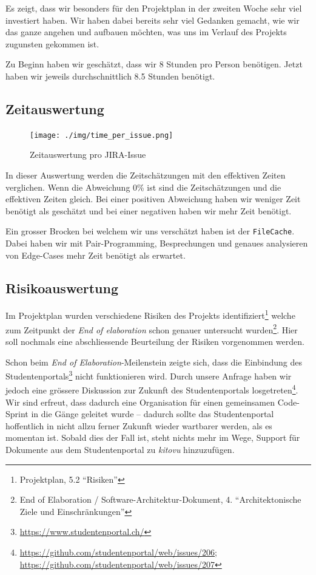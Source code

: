\documentclass[a4paper]{article}
\begin{document}
Es zeigt, dass wir besonders für den Projektplan in der zweiten Woche sehr viel investiert haben.
Wir haben dabei bereits sehr viel Gedanken gemacht, wie wir das ganze angehen und aufbauen möchten, was uns im Verlauf des Projekts zugunsten gekommen ist.

Zu Beginn haben wir geschätzt, dass wir 8 Stunden pro Person benötigen.
Jetzt haben wir jeweils durchschnittlich 8.5 Stunden benötigt. %

\subsection{Zeitauswertung}

\begin{figure}[H]
  \texttt{[image: ./img/time\_per\_issue.png]}
  \caption{Zeitauswertung pro JIRA-Issue}
\end{figure}

In dieser Auswertung werden die Zeitschätzungen mit den effektiven Zeiten verglichen.
Wenn die Abweichung 0\% ist sind die Zeitschätzungen und die effektiven Zeiten gleich.
Bei einer positiven Abweichung haben wir weniger Zeit benötigt als geschätzt und bei einer negativen haben wir mehr Zeit benötigt.

Ein grosser Brocken bei welchem wir uns verschätzt haben ist der \verb|FileCache|.
Dabei haben wir mit Pair-Programming, Besprechungen und genaues analysieren von Edge-Cases mehr Zeit benötigt als erwartet.


\subsection{Risikoauswertung}

Im Projektplan wurden verschiedene Risiken des Projekts
identifiziert\footnote{Projektplan, 5.2 ``Risiken''} welche zum Zeitpunkt der
\emph{End of elaboration} schon genauer untersucht wurden\footnote{End of
Elaboration / Software-Architektur-Dokument, 4. ``Architektonische Ziele und
Einschränkungen''}. Hier soll nochmals eine abschliessende Beurteilung der
Risiken vorgenommen werden.

Schon beim \emph{End of Elaboration}-Meilenstein zeigte sich, dass die
Einbindung des Studentenportals\footnote{\url{https://www.studentenportal.ch/}}
nicht funktionieren wird. Durch unsere Anfrage haben wir jedoch eine grössere
Diskussion zur Zukunft des Studentenportals
losgetreten\footnote{\url{https://github.com/studentenportal/web/issues/206}; \\
\url{https://github.com/studentenportal/web/issues/207}}. Wir sind erfreut, dass
dadurch eine Organisation für einen gemeinsamen Code-Sprint in die Gänge
geleitet wurde -- dadurch sollte das Studentenportal hoffentlich in nicht allzu
ferner Zukunft wieder wartbarer werden, als es momentan ist. Sobald dies der
Fall ist, steht nichts mehr im Wege, Support für Dokumente aus dem
Studentenportal zu \emph{kitovu} hinzuzufügen.
\end{document}
